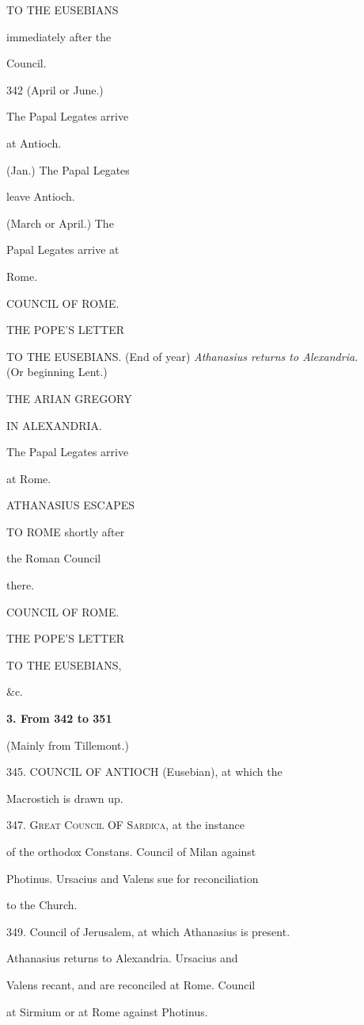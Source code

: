 TO THE EUSEBIANS

immediately after the

Council.

342
(April or June.)

The Papal Legates arrive

at Antioch.

(Jan.) The Papal Legates

leave Antioch.

(March or April.) The

Papal Legates arrive at

Rome.

COUNCIL OF ROME.

THE POPE’S
LETTER

TO THE EUSEBIANS.
(End of year) \emph{Athanasius returns to Alexandria.}\\
(Or beginning Lent.)

THE ARIAN
GREGORY

IN ALEXANDRIA.

The Papal Legates arrive

at Rome.

ATHANASIUS ESCAPES

TO ROME
shortly after

the Roman Council

there.

COUNCIL OF ROME.

THE POPE’S
LETTER

TO THE EUSEBIANS,

\&c.

\textbf{3. From 342 to 351}

(Mainly from Tillemont.)

345.
COUNCIL OF
ANTIOCH (Eusebian), at which the

Macrostich is drawn up.

347.
G\textsc{reat} C\textsc{ouncil}
OF S\textsc{ardica}, at the
instance

of the orthodox Constans. Council of Milan against

Photinus. Ursacius and Valens sue for reconciliation

to the Church.

349.
Council of Jerusalem, at which Athanasius is
present.

Athanasius returns to Alexandria. Ursacius and

Valens recant, and are reconciled at Rome. Council

at Sirmium or at Rome against Photinus.

